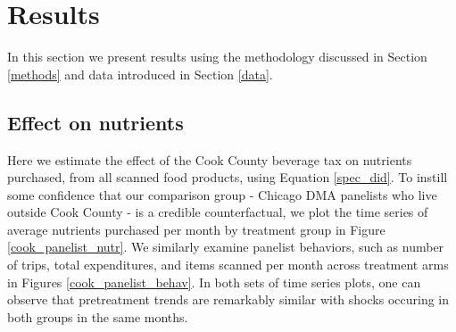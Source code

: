 \documentclass[12pt]{article}
\begin{document}

\section{Results} \label{results}
In this section we present results using the methodology discussed in Section \ref{methods} and data introduced in Section \ref{data}.

%
%
%

\subsection{Effect on nutrients}

Here we estimate the effect of the Cook County beverage tax on nutrients purchased, from all scanned food products, using Equation \ref{spec_did}. To instill some confidence that our comparison group - Chicago DMA panelists who live outside Cook County - is a credible counterfactual, we plot the time series of average nutrients purchased per month by treatment group in Figure \ref{cook_panelist_nutr}. We similarly examine panelist behaviors, such as number of trips, total expenditures, and items scanned per month across treatment arms in Figures \ref{cook_panelist_behav}. In both sets of time series plots, one can observe that pretreatment trends are remarkably similar with shocks occuring in both groups in the same months.
\end{document}
